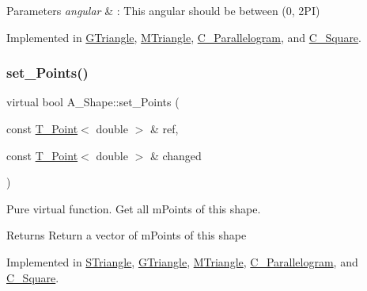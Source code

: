 \begin{DoxyParams}{Parameters}
{\em angular} & \+: This angular should be between (0, 2\+PI) \\
\hline
\end{DoxyParams}


Implemented in \hyperlink{classGTriangle_ae3ed75bbad4ba7fed68bc06c5834cfbe}{G\+Triangle}, \hyperlink{classMTriangle_a4be29553eeddf99c367b1ec220bc102b}{M\+Triangle}, \hyperlink{classParallelogram_ac498f6a15dea236ecc49bece023d17b0}{C_Parallelogram}, and \hyperlink{classSquare_a5714e182c30f996b78e74e1badd054a2}{C_Square}.

\mbox{\label{classShape_a6eb0d80cccc44cb72b06c61d9780bc6b}} 
\subsubsection{\texorpdfstring{set\+\_\+\+Points()}{set\_Points()}}
{\footnotesize\ttfamily virtual bool A_Shape\+::set\+\_\+\+Points (\begin{DoxyParamCaption}\item[{const \hyperlink{classPoint}{T_Point}$<$ double $>$ \&}]{ref,  }\item[{const \hyperlink{classPoint}{T_Point}$<$ double $>$ \&}]{changed }\end{DoxyParamCaption})\hspace{0.3cm}{\ttfamily [pure virtual]}}



Pure virtual function. Get all mPoints of this shape.

\begin{DoxyReturn}{Returns}
Return a vector of mPoints of this shape
\end{DoxyReturn}


Implemented in \hyperlink{classSTriangle_acab6926951bd8f2558e4c658610c0e51}{S\+Triangle}, \hyperlink{classGTriangle_adb9dae329128600209c54cc4587480ee}{G\+Triangle}, \hyperlink{classMTriangle_aec40d088d077bfb14f94895be871dfdf}{M\+Triangle}, \hyperlink{classParallelogram_ab74583703a60e4b798d7048aa684f44e}{C_Parallelogram}, and \hyperlink{classSquare_ac474644483fa85f7a4f39969f34868fe}{C_Square}.

\mbox{\label{classShape_a98fa87c6dc4c7045fd6897a8f3bc186c}} 
